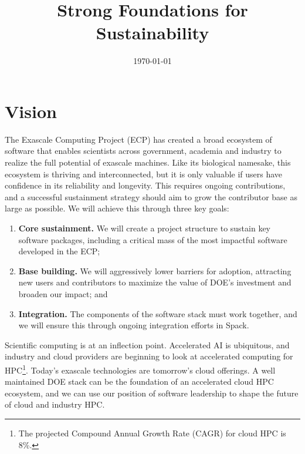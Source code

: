 \documentclass[11pt]{article}
\title{\vspace{-3em}\sf\huge\color{secblue}%
Strong Foundations for Sustainability}
\date{\vspace{-4em}\today\vspace{-3em}}
\begin{document}
\setcounter{page}{1}

\maketitle

\section{Vision}

The Exascale Computing Project (ECP) has created a broad ecosystem of software that
enables scientists across government, academia and industry to realize the full
potential of exascale machines. Like its biological namesake, this ecosystem is thriving
and interconnected,
but it is only valuable if users have confidence in its reliability and longevity. This
requires ongoing contributions, and a successful sustainment strategy should aim to grow
the contributor base as large as possible. We will achieve this through three key goals:

\begin{enumerate}
\item {\bf Core sustainment.} We will create a project structure to sustain key
  software packages, including a critical mass of the most impactful software developed in the ECP;
\item {\bf Base building.} We will aggressively lower barriers for adoption, attracting new
    users and contributors to maximize the value of DOE's investment and broaden our
    impact; and
  \item {\bf Integration.} The components of the software stack must work together, and
    we will ensure this through ongoing integration efforts in Spack.
\end{enumerate}

Scientific computing is at an inflection point. Accelerated AI is ubiquitous, and
industry and cloud providers are beginning to look at accelerated computing for
HPC\footnote{The projected Compound Annual Growth Rate (CAGR) for cloud HPC is 8\%.}.
Today's exascale technologies are tomorrow's cloud offerings. A well maintained DOE
stack can be the foundation of an accelerated cloud HPC ecosystem, and we can use our
position of software leadership to shape the future of cloud and industry HPC.
\end{document}
